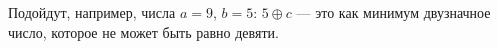 \begin{itemize}
\itA {}

\itB {}

\itC Подойдут, например, числа $a=9$, $b=5$: $5 \oplus c$ — это как минимум двузначное число, которое не может быть равно девяти.
\end{itemize}